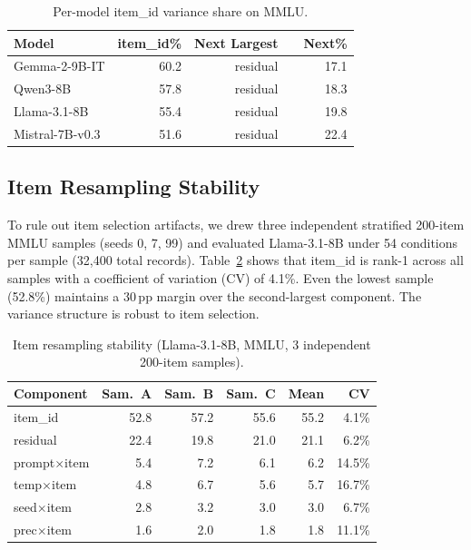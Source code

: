 \documentclass[11pt]{article}
\newcommand{\pp}{\,\text{pp}}
\begin{document}
\begin{table}[t]
\centering
\caption{Per-model item\_id variance share on MMLU.}
\label{tab:mmlu_permodel}
\small
\begin{tabular}{lrrlr}
\toprule
Model & item\_id\% & Next Largest & & Next\% \\
\midrule
Gemma-2-9B-IT & 60.2 & residual & & 17.1 \\
Qwen3-8B & 57.8 & residual & & 18.3 \\
Llama-3.1-8B & 55.4 & residual & & 19.8 \\
Mistral-7B-v0.3 & 51.6 & residual & & 22.4 \\
\bottomrule
\end{tabular}
\end{table}

\subsection{Item Resampling Stability}
\label{sec:resampling}

To rule out item selection artifacts, we drew three independent stratified 200-item MMLU samples (seeds 0, 7, 99) and evaluated Llama-3.1-8B under 54 conditions per sample (32{,}400 total records). Table~\ref{tab:resampling} shows that item\_id is rank-1 across all samples with a coefficient of variation (CV) of 4.1\%. Even the lowest sample (52.8\%) maintains a 30$\pp$ margin over the second-largest component. The variance structure is robust to item selection.

\begin{table}[t]
\centering
\caption{Item resampling stability (Llama-3.1-8B, MMLU, 3 independent 200-item samples).}
\label{tab:resampling}
\small
\begin{tabular}{lrrrrr}
\toprule
Component & Sam.\ A & Sam.\ B & Sam.\ C & Mean & CV \\
\midrule
item\_id & 52.8 & 57.2 & 55.6 & 55.2 & 4.1\% \\
residual & 22.4 & 19.8 & 21.0 & 21.1 & 6.2\% \\
prompt$\times$item & 5.4 & 7.2 & 6.1 & 6.2 & 14.5\% \\
temp$\times$item & 4.8 & 6.7 & 5.6 & 5.7 & 16.7\% \\
seed$\times$item & 2.8 & 3.2 & 3.0 & 3.0 & 6.7\% \\
prec$\times$item & 1.6 & 2.0 & 1.8 & 1.8 & 11.1\% \\
\bottomrule
\end{tabular}
\end{table}
\end{document}
